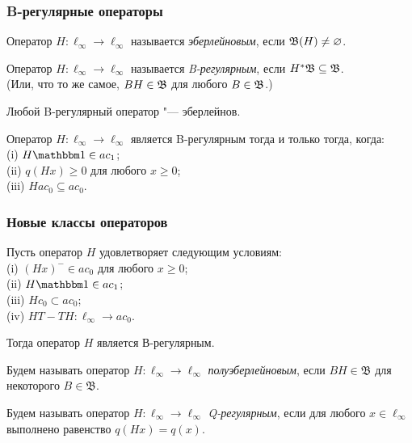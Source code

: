 \begin{frame}\frametitle{B-регулярные операторы}
	\begin{ddefinition}
		Оператор $H : \ell_\infty \to \ell_\infty$ называется \emph{эберлейновым},
		если $\mathfrak{B}(H) \ne\varnothing$.
	\end{ddefinition}
	\begin{ddefinition}
		\label{def:B-regular_operator}
		Оператор $H : \ell_\infty \to \ell_\infty$ называется \emph{B-регулярным},
		если $H^*\mathfrak{B} \subseteq \mathfrak{B}$.
		\\
		(Или, что то же самое, $BH\in\mathfrak{B}$ для любого $B\in\mathfrak{B}$.)
	\end{ddefinition}
	\begin{ttheorem}
		\label{thm:B-regular_is_Eberlein}
		Любой B-регулярный оператор "--- эберлейнов.
	\end{ttheorem}
	\begin{ttheorem}
		Оператор $H:\ell_\infty \to \ell_\infty$ является B-регулярным тогда и только тогда, когда:
		\\(i) $H\one \in ac_1$;
		\\(ii) $q(Hx)\geq 0$ для любого $x\geq 0$;
		\\(iii) $H ac_0 \subseteq ac_0$.
	\end{ttheorem}
\end{frame}


\begin{frame}\frametitle{{Новые классы операторов}}
	\vfill
	\begin{llemma}
		\label{lem:suff_B_reg}
		Пусть оператор $H$ удовлетворяет следующим условиям:
		\\(i)   $(Hx)^- \in ac_0$ для любого $x\geq 0$;
		\\(ii)  $H\one\in ac_1$;
		\\(iii) $H c_0 \subset ac_0$;
		\\(iv)  $HT-TH : \ell_\infty \to ac_0$.%

		Тогда оператор $H$ является В-регулярным.
	\end{llemma}
    \vfill
	\begin{ddefinition}
		Будем называть оператор $H:\ell_\infty \to \ell_\infty$ \emph{полуэберлейновым}, если $BH\in\mathfrak B$ для некоторого $B\in\mathfrak B$.
	\end{ddefinition}
	\vfill
	\begin{ddefinition}
		Будем называть оператор $H:\ell_\infty \to \ell_\infty$ \emph{Q-регулярным}, если
		для любого $x\in\ell_\infty$ выполнено равенство $q(Hx) = q(x)$.
	\end{ddefinition}
	\vfill
\end{frame}


